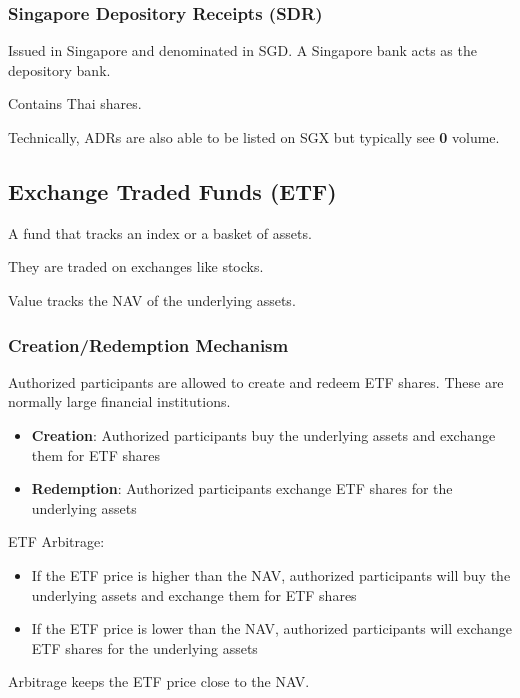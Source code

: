 \subsubsection{Singapore Depository Receipts (SDR)}
Issued in Singapore and denominated in SGD.
A Singapore bank acts as the depository bank.

Contains Thai shares.

Technically, ADRs are also able to be listed on SGX but typically see \textbf{0} volume.

\subsection{Exchange Traded Funds (ETF)}
A fund that tracks an index or a basket of assets.

They are traded on exchanges like stocks.

Value tracks the NAV of the underlying assets.

\subsubsection{Creation/Redemption Mechanism}
Authorized participants are allowed to create and redeem ETF shares. These are normally large financial institutions.
\begin{itemize}
    \item \textbf{Creation}: Authorized participants buy the underlying assets and exchange them for ETF shares
    \item \textbf{Redemption}: Authorized participants exchange ETF shares for the underlying assets
\end{itemize}

ETF Arbitrage:
\begin{itemize}
    \item If the ETF price is higher than the NAV, authorized participants will buy the underlying assets and exchange them for ETF shares
    \item If the ETF price is lower than the NAV, authorized participants will exchange ETF shares for the underlying assets
\end{itemize}

Arbitrage keeps the ETF price close to the NAV.

